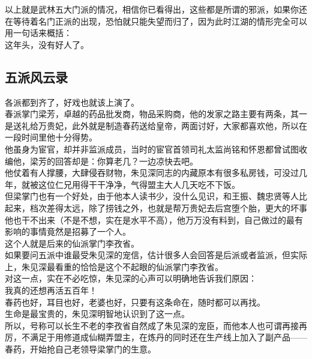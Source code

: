 \begin{multicols}{\theparacolNo}
以上就是武林五大门派的情况，相信你已看得出，这些都是所谓的邪派，如果你还在等待着名门正派的出现，恐怕就只能失望而归了，因为此时江湖的情形完全可以用一句话来概括：\\

这年头，没有好人了。\\

\subsection{五派风云录}
各派都到齐了，好戏也就该上演了。\\

春派掌门梁芳，卓越的药品批发商，物品采购商，他的发家之路主要有两条，其一是送礼给万贵妃，此外就是制造春药送给皇帝，两面讨好，大家都喜欢他，所以在一段时间里他十分得势。\\

他虽身为宦官，却并非监派成员，当时的宦官首领司礼太监尚铭和怀恩都曾试图收编他，梁芳的回答却是：你算老几？一边凉快去吧。\\

他仗着有人撑腰，大肆侵吞财物，朱见深同志的内藏原本有很多私房钱，可没过几年，就被这位仁兄用得干干净净，气得盟主大人几天吃不下饭。\\

但梁掌门也有一个好处，由于他本人读书少，没什么见识，和王振、魏忠贤等人比起来，档次差得太远，除了捞钱之外，也就是帮万贵妃去后宫堕个胎，更大的坏事他也干不出来（不是不想，实在是水平不高），他万万没有料到，自己做过的最有影响的事情竟然是招募了一个人。\\

这个人就是后来的仙派掌门李孜省。\\

如果要问五派中谁最受朱见深的宠信，估计很多人会回答是后派或者监派，但实际上，朱见深最看重的恰恰是这个不起眼的仙派掌门李孜省。\\

对这一点，实在不必吃惊，朱见深的心声可以明确地告诉我们原因：\\

我真的还想再活五百年！\\

春药也好，耳目也好，老婆也好，只要有这条命在，随时都可以再找。\\

生命是最宝贵的，朱见深明智地认识到了这一点。\\

所以，号称可以长生不老的李孜省自然成了朱见深的宠臣，而他本人也可谓再接再厉，不满足于用修道成仙糊弄盟主，在炼丹的同时还在生产线上加入了副产品——春药，开始抢自己老领导梁掌门的生意。\\


\end{multicols}
